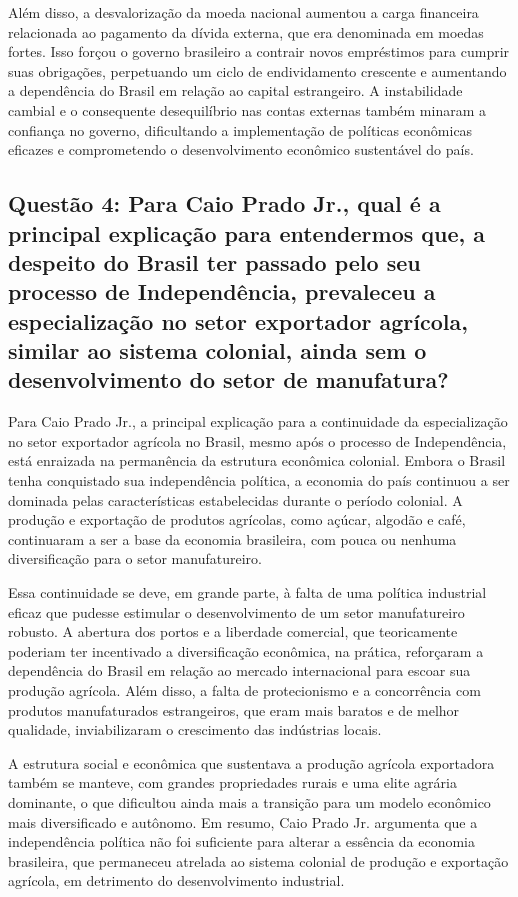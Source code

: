 \documentclass[a4paper,12pt]{article}[abntex2]
\begin{document}
Além disso, a desvalorização da moeda nacional aumentou a carga financeira relacionada ao pagamento da dívida externa, que era denominada em moedas fortes. Isso forçou o governo brasileiro a contrair novos empréstimos para cumprir suas obrigações, perpetuando um ciclo de endividamento crescente e aumentando a dependência do Brasil em relação ao capital estrangeiro. A instabilidade cambial e o consequente desequilíbrio nas contas externas também minaram a confiança no governo, dificultando a implementação de políticas econômicas eficazes e comprometendo o desenvolvimento econômico sustentável do país.

\subsection{\textbf{Questão 4: Para Caio Prado Jr., qual é a principal explicação para entendermos que, a despeito do Brasil ter passado pelo seu processo de Independência, prevaleceu a especialização no setor exportador agrícola, similar ao sistema colonial, ainda sem o desenvolvimento do setor de manufatura?}}

Para Caio Prado Jr., a principal explicação para a continuidade da especialização no setor exportador agrícola no Brasil, mesmo após o processo de Independência, está enraizada na permanência da estrutura econômica colonial. Embora o Brasil tenha conquistado sua independência política, a economia do país continuou a ser dominada pelas características estabelecidas durante o período colonial. A produção e exportação de produtos agrícolas, como açúcar, algodão e café, continuaram a ser a base da economia brasileira, com pouca ou nenhuma diversificação para o setor manufatureiro.

Essa continuidade se deve, em grande parte, à falta de uma política industrial eficaz que pudesse estimular o desenvolvimento de um setor manufatureiro robusto. A abertura dos portos e a liberdade comercial, que teoricamente poderiam ter incentivado a diversificação econômica, na prática, reforçaram a dependência do Brasil em relação ao mercado internacional para escoar sua produção agrícola. Além disso, a falta de protecionismo e a concorrência com produtos manufaturados estrangeiros, que eram mais baratos e de melhor qualidade, inviabilizaram o crescimento das indústrias locais.

A estrutura social e econômica que sustentava a produção agrícola exportadora também se manteve, com grandes propriedades rurais e uma elite agrária dominante, o que dificultou ainda mais a transição para um modelo econômico mais diversificado e autônomo. Em resumo, Caio Prado Jr. argumenta que a independência política não foi suficiente para alterar a essência da economia brasileira, que permaneceu atrelada ao sistema colonial de produção e exportação agrícola, em detrimento do desenvolvimento industrial.
\end{document}
